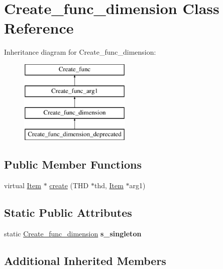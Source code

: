 \hypertarget{classCreate__func__dimension}{}\section{Create\+\_\+func\+\_\+dimension Class Reference}
\label{classCreate__func__dimension}
Inheritance diagram for Create\+\_\+func\+\_\+dimension\+:\begin{figure}[H]
\begin{center}
\leavevmode
\includegraphics[height=4.000000cm]{classCreate__func__dimension}
\end{center}
\end{figure}
\subsection*{Public Member Functions}
\begin{DoxyCompactItemize}
\item 
virtual \mbox{\hyperlink{classItem}{Item}} $\ast$ \mbox{\hyperlink{classCreate__func__dimension_a0bb53cc401570127d5ad15c5eb801f39}{create}} (T\+HD $\ast$thd, \mbox{\hyperlink{classItem}{Item}} $\ast$arg1)
\end{DoxyCompactItemize}
\subsection*{Static Public Attributes}
\begin{DoxyCompactItemize}
\item 
\mbox{\label{classCreate__func__dimension_a29cc21ecf3fe8ac9c229a92cd344540c}} 
static \mbox{\hyperlink{classCreate__func__dimension}{Create\+\_\+func\+\_\+dimension}} {\bfseries s\+\_\+singleton}
\end{DoxyCompactItemize}
\subsection*{Additional Inherited Members}


